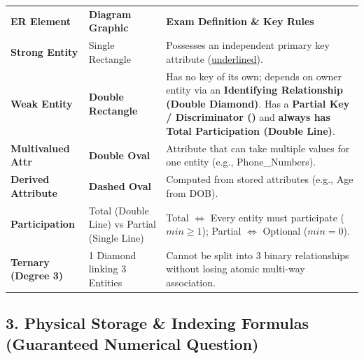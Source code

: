 \documentclass[10pt,a4paper]{article}
\newcommand{\ic}[1]{\mbox{\colorbox{AnthCodeBG}{\footnotesize\ttfamily\textcolor{AnthBlue}{#1}}}}
\begin{document}
\begin{center}
\scriptsize
\begin{tabularx}{\textwidth}{L{2.8cm} L{3.5cm} X}
  \color{white}\textbf{ER Element} & \color{white}\textbf{Diagram Graphic} & \color{white}\textbf{Exam Definition \& Key Rules} \\
   \textbf{Strong Entity} & Single Rectangle & Possesses an independent primary key attribute (\underline{underlined}). \\
  \textbf{Weak Entity} & \textbf{Double Rectangle} & Has no key of its own; depends on owner entity via an \textbf{Identifying Relationship (Double Diamond)}. Has a \textbf{Partial Key / Discriminator ()} and \textbf{always has Total Participation (Double Line)}. \\
   \textbf{Multivalued Attr} & \textbf{Double Oval} & Attribute that can take multiple values for one entity (e.g., \ic{Phone\_Numbers}). \\
  \textbf{Derived Attribute} & \textbf{Dashed Oval} & Computed from stored attributes (e.g., \ic{Age} from \ic{DOB}). \\
   \textbf{Participation} & Total (Double Line) vs Partial (Single Line) & Total $\iff$ Every entity must participate ($min \ge 1$); Partial $\iff$ Optional ($min = 0$). \\
  \textbf{Ternary (Degree 3)} & 1 Diamond linking 3 Entities & Cannot be split into 3 binary relationships without losing atomic multi-way association. \\
\end{tabularx}
\end{center}

\subsection{3. Physical Storage \& Indexing Formulas (Guaranteed Numerical Question)}
\end{document}
